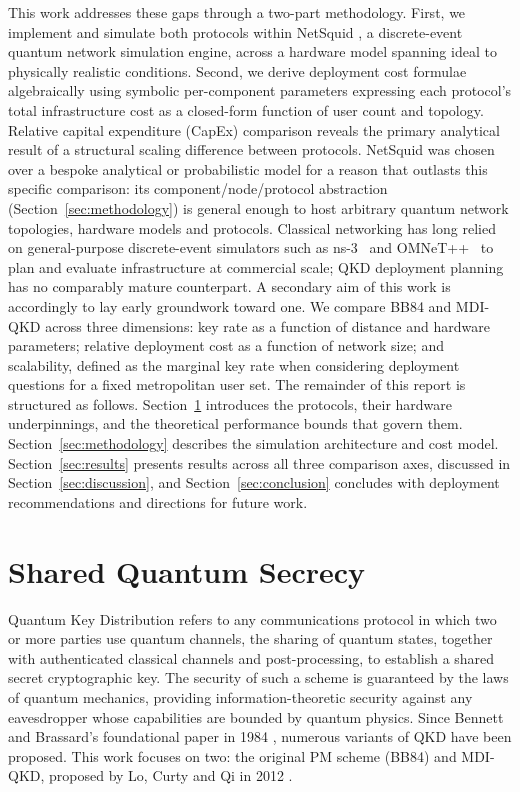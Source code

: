 \documentclass[12pt]{article}
\let\oldsection\section
\renewcommand{\section}{\clearpage\oldsection}
\begin{document}
This work addresses these gaps through a two-part methodology. First, we implement and simulate both protocols within NetSquid \cite{Coopmans_2021}, a discrete-event quantum network simulation engine, across a hardware model spanning ideal to physically realistic conditions. Second, we derive deployment cost formulae algebraically using symbolic per-component parameters expressing each protocol's total infrastructure cost as a closed-form function of user count and topology. Relative capital expenditure (CapEx) comparison reveals the primary analytical result of a structural scaling difference between protocols. NetSquid was chosen over a bespoke analytical or probabilistic model for a reason that outlasts this specific comparison: its component/node/protocol abstraction (Section~\ref{sec:methodology}) is general enough to host arbitrary quantum network topologies, hardware models and protocols. Classical networking has long relied on general-purpose discrete-event simulators such as ns-3~\cite{henderson2008network} and OMNeT++~\cite{varga2001omnet++} to plan and evaluate infrastructure at commercial scale; QKD deployment planning has no comparably mature counterpart. A secondary aim of this work is accordingly to lay early groundwork toward one. We compare BB84 and MDI-QKD across three dimensions: key rate as a function of distance and hardware parameters; relative deployment cost as a function of network size; and scalability, defined as the marginal key rate when considering deployment questions for a fixed metropolitan user set. The remainder of this report is structured as follows. Section~\ref{sec:background} introduces the protocols, their hardware underpinnings, and the theoretical performance bounds that govern them. Section~\ref{sec:methodology} describes the simulation architecture and cost model. Section~\ref{sec:results} presents results across all three comparison axes, discussed in Section~\ref{sec:discussion}, and Section~\ref{sec:conclusion} concludes with deployment recommendations and directions for future work.

\section{Shared Quantum Secrecy}
\label{sec:background}

Quantum Key Distribution refers to any communications protocol in which two or more parties use quantum channels, the sharing of quantum states, together with authenticated classical channels and post-processing, to establish a shared secret cryptographic key. The security of such a scheme is guaranteed by the laws of quantum mechanics, providing information-theoretic security against any eavesdropper whose capabilities are bounded by quantum physics. Since Bennett and Brassard's foundational paper in 1984 \cite{Bennett_2014}, numerous variants of QKD have been proposed. This work focuses on two: the original PM scheme (BB84) and MDI-QKD, proposed by Lo, Curty and Qi in 2012 \cite{Lo_2012}.
\end{document}

